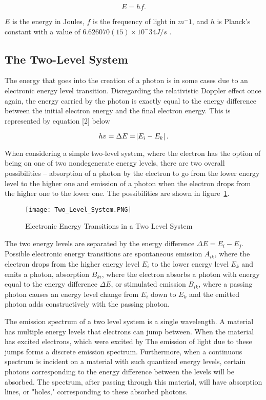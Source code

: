 \documentclass{article}
\begin{document}
\begin{equation}
    E = hf.
\end{equation}

$E$ is the energy in Joules, $f$ is the frequency of light in $m^-1$, and $h$ is Planck's constant with a value of $6.626 070(15) \times 10^-34 J/s$ \cite{units}. 

\subsection{The Two-Level System}
The energy that goes into the creation of a photon is in some cases due to an electronic energy level transition. Disregarding the relativistic Doppler effect once again, the energy carried by the photon is exactly equal to the energy difference between the initial electron energy and the final electron energy. This is represented by equation [2] below

\begin{equation}
    hv = \Delta E = \abs{E_i - E_k}.
\end{equation}

When considering a simple two-level system, where the electron has the option of being on one of two nondegenerate energy levels, there are two overall possibilities -- absorption of a photon by the electron to go from the lower energy level to the higher one and emission of a photon when the electron drops from the higher one to the lower one. The possibilities are shown in figure~\ref{fig:two_level}.



\begin{figure} [h!]
    \centering
    \texttt{[image: Two\_Level\_System.PNG]}
    \caption{Electronic Energy Transitions in a Two Level System}
    \label{fig:two_level}
\end{figure}

The two energy levels are separated by the energy difference $\Delta E = E_i - E_j$. Possible electronic energy transitions are spontaneous emission  $A_{ik}$, where the electron drops from the higher energy level $E_i$ to the lower energy level $E_k$ and emits a photon, absorption $B_{ki}$, where the electron absorbs a photon with energy equal to the energy difference $\Delta E$, or stimulated emission $B_{ik}$, where a passing photon causes an energy level change from $E_i$ down to $E_k$ and the emitted photon adds constructively with the passing photon.

The emission spectrum of a two level system is a single wavelength. A material has multiple energy levels that electrons can jump between. When the material has excited electrons, which were excited by The emission of light due to these jumps forms a discrete emission spectrum. Furthermore, when a continuous spectrum is incident on a material with such quantized energy levels, certain photons corresponding to the energy difference between the levels will be absorbed. The spectrum, after passing through this material, will have absorption lines, or "holes," corresponding to these absorbed photons.
\end{document}
